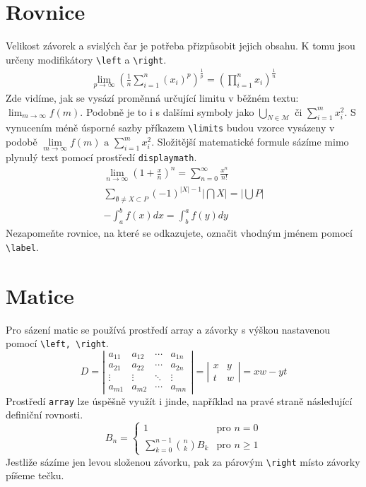 \documentclass[twocolumn, 11pt, a4paper]{article}
\begin{document}
\section{Rovnice}
Velikost závorek a svislých čar je potřeba přizpůsobit jejich obsahu.
K tomu jsou určeny modifikátory \texttt{\textbackslash left} a \texttt{\textbackslash right}.
\begin{eqnarray}
    \lim_{p \to \infty} \left( \frac{1}{n} \sum_{i=1}^n (x_i)^p \right)^\frac{1}{p} = \left( \prod_{i=1}^n x_i \right)^\frac{1}{n}
\end{eqnarray}
Zde vidíme, jak se vysází proměnná určující limitu v běžném textu: $\lim_{m \to \infty} f(m)$.
Podobně je to i s dalšími symboly jako $\bigcup_{N \in \mathcal{M}}$ či $\sum_{i=1}^m x_{i}^2$.
S vynucením méně úsporné sazby příkazem \texttt{\textbackslash limits} budou vzorce vysázeny v podobě $\lim\limits_{m \to \infty} f(m) \text{ a }\sum\limits_{i=1}^m x_{i}^2$.
Složitější matematické formule sázíme mimo plynulý text pomocí prostředí \texttt{displaymath}.
\begin{eqnarray}
\lim_{n \to \infty} \left( 1 + \frac{x}{n} \right)^n = \sum_{n=0}^\infty \frac{x^n}{n!} \\
\sum_{\emptyset \neq X \subset P} (-1)^{|X| -1} |\bigcap X| = |\bigcup P| \\ \label{equation:1:1} \label{equation:1:2}
-\int_a^b f(x)dx = \int_b^a f(y)dy
\end{eqnarray}
Nezapomeňte rovnice, na které se odkazujete, označit vhodným jménem pomocí \texttt{\textbackslash label}.
\section{Matice}
Pro sázení matic se používá prostředí array a závorky s výškou nastavenou pomocí
\texttt{\textbackslash left, \textbackslash right}.
\[
D = \left|
\begin{array}{cccc}
  a_{11} & a_{12} & \cdots & a_{1n} \\
  a_{21} & a_{22} & \cdots & a_{2n} \\
  \vdots & \vdots & \ddots & \vdots \\
  a_{m1} & a_{m2} & \cdots & a_{mn}
\end{array}
\right| = \left|
\begin{array}{cc}
  x & y \\
  t & w
\end{array}
\right| = xw - yt
\]
Prostředí \texttt{array} lze úspěšně využít i jinde, například
na pravé straně následující definiční rovnosti.
\[
B_n =
\begin{cases}
  1 & \text{pro } n = 0 \\
  \sum\limits_{k=0}^{n-1} \binom{n}{k} B_k & \text{pro } n \geq 1
\end{cases}
\]
Jestliže sázíme jen levou složenou závorku, pak za párovým \texttt{\textbackslash right}
místo závorky píšeme tečku.
\end{document}
